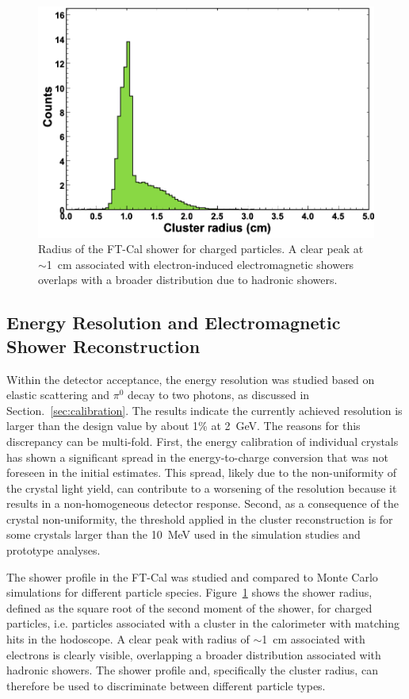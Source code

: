 \begin{figure}[h]
\includegraphics[height=0.65\columnwidth]{fig/ft_shower.png}
\caption{Radius of the FT-Cal shower for charged particles. A clear peak at $\sim$1~cm associated with
  electron-induced electromagnetic showers overlaps with a broader distribution due to hadronic showers.}
\label{fig:ft_shower}
\end{figure}

\subsection{Energy Resolution and Electromagnetic Shower Reconstruction}

Within the detector acceptance, the energy resolution was studied based on elastic scattering and $\pi^0$ decay to
two photons, as discussed in Section.~\ref{sec:calibration}. The results indicate the currently achieved resolution is
larger than the design value by about 1\% at 2~GeV. The reasons for this discrepancy can be multi-fold. First, the
energy calibration of individual crystals has shown a significant spread in the energy-to-charge conversion that was
not foreseen in the initial estimates. This spread, likely due to the non-uniformity of the crystal light yield, can
contribute to a worsening of the resolution because it results in a non-homogeneous detector response.  Second, as a
consequence of the crystal non-uniformity, the threshold applied in the cluster reconstruction is for some crystals
larger than the 10~MeV used in the simulation studies and prototype analyses.

The shower profile in the FT-Cal was studied and compared to Monte Carlo simulations for different particle
species. Figure~\ref{fig:ft_shower} shows the shower radius, defined as the square root of the second moment of
the shower, for charged particles, i.e. particles associated with a cluster in the calorimeter with matching hits in the
hodoscope. A clear peak with radius of $\sim$1~cm associated with electrons is clearly visible, overlapping a
broader distribution associated with hadronic showers. The shower profile and, specifically the cluster radius, can
therefore be used to discriminate between different particle types.

